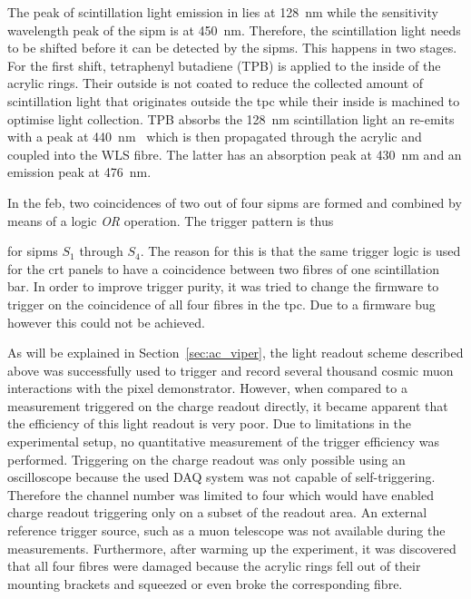 The peak of scintillation light emission in \lar{} lies at \SI{128}{\nano\metre} while the sensitivity wavelength peak of the \gls{sipm} is at \SI{450}{\nano\metre}.
Therefore, the scintillation light needs to be shifted before it can be detected by the \glspl{sipm}.
This happens in two stages.
For the first shift, tetraphenyl butadiene (TPB) is applied to the inside of the acrylic rings.
Their outside is not coated to reduce the collected amount of scintillation light that originates outside the \gls{tpc} while their inside is machined to optimise light collection.
TPB absorbs the \SI{128}{\nano\metre} scintillation light an re-emits with a peak at \SI{440}{\nano\metre}~\cite{tpb} which is then propagated through the acrylic and coupled into the WLS fibre.
The latter has an absorption peak at \SI{430}{\nano\metre} and an emission peak at \SI{476}{\nano\metre}.

In the \gls{feb}, two coincidences of two out of four \glspl{sipm} are formed and combined by means of a logic \emph{OR} operation.
The trigger pattern is thus
for \glspl{sipm} $S_1$ through $S_4$.
The reason for this is that the same trigger logic is used for the \gls{crt} panels to have a coincidence between two fibres of one scintillation bar.
In order to improve trigger purity, it was tried to change the firmware to trigger on the coincidence of all four fibres in the \gls{tpc}.
Due to a firmware bug however this could not be achieved.

As will be explained in Section~\ref{sec:ac_viper}, the light readout scheme described above was successfully used to trigger and record several thousand cosmic muon interactions with the \AC{} pixel demonstrator.
However, when compared to a measurement triggered on the charge readout directly, it became apparent that the efficiency of this light readout is very poor.
Due to limitations in the experimental setup, no quantitative measurement of the trigger efficiency was performed.
Triggering on the charge readout was only possible using an oscilloscope because the used DAQ system was not capable of self-triggering.
Therefore the channel number was limited to four which would have enabled charge readout triggering only on a subset of the readout area.
An external reference trigger source, such as a muon telescope was not available during the measurements.
Furthermore, after warming up the experiment, it was discovered that all four fibres were damaged because the acrylic rings fell out of their mounting brackets and squeezed or even broke the corresponding fibre.

